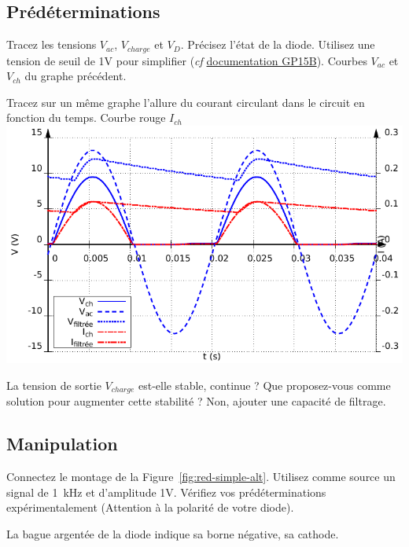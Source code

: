\documentclass{../template/labo}
\begin{document}
\subsection{Prédéterminations}
\begin{predet}
\Question
{
	Tracez les tensions $V_{ac}$, $V_{charge}$ et $V_D$. Précisez l'état de la diode. Utilisez une tension de seuil de 1V pour simplifier (\textit{cf} \href{https://www.vishay.com/docs/88638/gp15a.pdf}{documentation GP15B}).%
}
{Courbes $V_{ac}$ et $V_{ch}$ du graphe précédent.}%
	\label{Q:7}

\Question
{
	Tracez sur un même graphe l'allure du courant circulant dans le circuit en fonction du temps.
}
{Courbe rouge $I_{ch}$\\
	\includegraphics[width=\linewidth]{mesures/simple_alternance.pdf}}%
	\label{Q:8}

\Question
{
	La tension de sortie $V_{charge}$ est-elle stable, continue ? Que proposez-vous comme solution pour augmenter cette stabilité ?
}
{Non, ajouter une capacité de filtrage.}%
	\label{Q:9}
\end{predet}

\subsection{Manipulation}
\begin{manip}
\Question
{
	Connectez le montage de la Figure~\ref{fig:red-simple-alt}. Utilisez comme source un signal de 1~kHz et d'amplitude 1V. Vérifiez vos prédéterminations expérimentalement (Attention à la polarité de votre diode).
	\begin{astuce}
		La bague argentée de la diode indique sa borne négative, sa cathode.
	\end{astuce}
}
{}
\end{manip}
\end{document}
